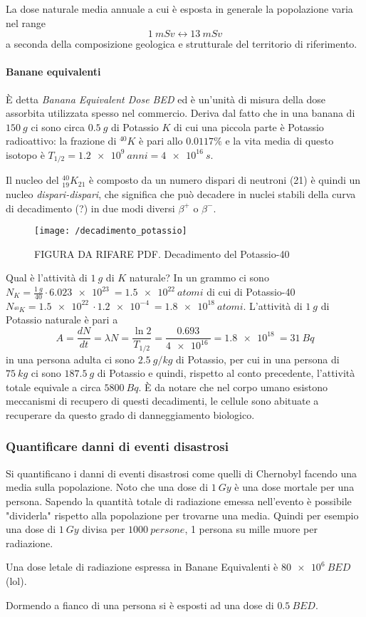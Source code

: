 La dose naturale media annuale a cui è esposta in generale la popolazione varia nel range
$$ \SI{1}{mSv} \leftrightarrow \SI{13}{mSv} $$
a seconda della composizione geologica e strutturale del territorio di riferimento.

\paragraph{Banane equivalenti} È detta \emph{Banana Equivalent Dose BED} ed è un'unità di misura della dose assorbita utilizzata spesso nel commercio.
Deriva dal fatto che in una banana di $\SI{150}{g}$ ci sono circa $\SI{0.5}{g}$ di Potassio $K$ di cui una piccola parte è Potassio radioattivo: la frazione di $^{40}K$ è pari allo $0.0117\%$ e la vita media di questo isotopo è $T_{1/2} = \SI{1.2e9}{anni}=\SI{4e16}{s}$.

Il nucleo del $^{40}_{19}K_{21}$ è composto da un numero dispari di neutroni (21) è quindi un nucleo \emph{dispari-dispari}, che significa che può decadere in nuclei stabili della curva di decadimento (?) in due modi diversi $\beta^+$ o $\beta^-$.
\begin{figure}[h]
\centering
\texttt{[image: /decadimento\_potassio]}
\caption{FIGURA DA RIFARE PDF. Decadimento del Potassio-40}
\end{figure}

Qual è l'attività di $\SI{1}{g}$ di $K$ naturale?
In un grammo ci sono $N_K = \frac{\SI{1}{g}}{40} \cdot \SI{6.023e23}{} = \SI{1.5e22}{atomi}$ di cui di Potassio-40 
$ N_{^{40}K} = \SI{1.5e22}{} \cdot \SI{1.2e-4}{} = \SI{1.8e18}{atomi} $.
L'attività di $\SI{1}{g}$ di Potassio naturale è pari a
\begin{equation}
A = \frac{dN}{dt} = \lambda N = \frac{\ln 2}{T_{1/2}} = \frac{0.693}{\SI{4e16}{}} = \SI{1.8e18}{} = \SI{31}{Bq}
\end{equation}
in una persona adulta ci sono $\SI{2.5}{g/kg}$ di Potassio, per cui in una persona di $\SI{75}{kg}$ ci sono $\SI{187.5}{g}$ di Potassio e quindi, rispetto al conto precedente, l'attività totale equivale a circa $\SI{5800}{Bq}$.
È da notare che nel corpo umano esistono meccanismi di recupero di questi decadimenti, le cellule sono abituate a recuperare da questo grado di danneggiamento biologico.


\subsubsection{Quantificare danni di eventi disastrosi}
Si quantificano i danni di eventi disastrosi come quelli di Chernobyl facendo una media sulla popolazione.
Noto che una dose di $\SI{1}{Gy}$ è una dose mortale per una persona.
Sapendo la quantità totale di radiazione emessa nell'evento è possibile "dividerla" rispetto alla popolazione per trovarne una media.
Quindi per esempio una dose di $\SI{1}{Gy}$ divisa per $\SI{1000}{persone}$, 1 persona su mille muore per radiazione.

Una dose letale di radiazione espressa in Banane Equivalenti è $\SI{80e6}{BED}$ (lol).

Dormendo a fianco di una persona si è esposti ad una dose di $\SI{0.5}{BED}$.






